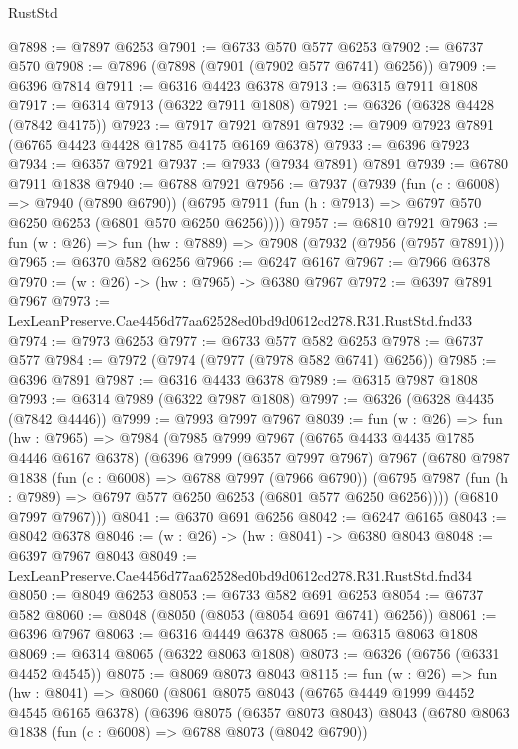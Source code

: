 \begin{lexlean}{RustStd}
\begin{coremodule}
@7898 := @7897 @6253
@7901 := @6733 @570 @577 @6253
@7902 := @6737 @570
@7908 := @7896 (@7898 (@7901 (@7902 @577 @6741) @6256))
@7909 := @6396 @7814
@7911 := @6316 @4423 @6378
@7913 := @6315 @7911 @1808
@7917 := @6314 @7913 (@6322 @7911 @1808)
@7921 := @6326 (@6328 @4428 (@7842 @4175))
@7923 := @7917 @7921 @7891
@7932 := @7909 @7923 @7891 (@6765 @4423 @4428 @1785 @4175 @6169 @6378)
@7933 := @6396 @7923
@7934 := @6357 @7921
@7937 := @7933 (@7934 @7891) @7891
@7939 := @6780 @7911 @1838
@7940 := @6788 @7921
@7956 := @7937
    (@7939
      (fun (c : @6008) => @7940 (@7890 @6790))
      (@6795 @7911 (fun (h : @7913) => @6797 @570 @6250 @6253 (@6801 @570 @6250 @6256))))
@7957 := @6810 @7921
@7963 := fun (w : @26) => fun (hw : @7889) => @7908 (@7932 (@7956 (@7957 @7891)))
@7965 := @6370 @582 @6256
@7966 := @6247 @6167
@7967 := @7966 @6378
@7970 := (w : @26) -> (hw : @7965) -> @6380 @7967
@7972 := @6397 @7891 @7967
@7973 := LexLeanPreserve.Cae4456d77aa62528ed0bd9d0612cd278.R31.RustStd.fnd33
@7974 := @7973 @6253
@7977 := @6733 @577 @582 @6253
@7978 := @6737 @577
@7984 := @7972 (@7974 (@7977 (@7978 @582 @6741) @6256))
@7985 := @6396 @7891
@7987 := @6316 @4433 @6378
@7989 := @6315 @7987 @1808
@7993 := @6314 @7989 (@6322 @7987 @1808)
@7997 := @6326 (@6328 @4435 (@7842 @4446))
@7999 := @7993 @7997 @7967
@8039 := fun (w : @26) =>
  fun (hw : @7965) =>
  @7984
    (@7985
      @7999
      @7967
      (@6765 @4433 @4435 @1785 @4446 @6167 @6378)
      (@6396
        @7999
        (@6357 @7997 @7967)
        @7967
        (@6780
          @7987
          @1838
          (fun (c : @6008) => @6788 @7997 (@7966 @6790))
          (@6795 @7987 (fun (h : @7989) => @6797 @577 @6250 @6253 (@6801 @577 @6250 @6256))))
        (@6810 @7997 @7967)))
@8041 := @6370 @691 @6256
@8042 := @6247 @6165
@8043 := @8042 @6378
@8046 := (w : @26) -> (hw : @8041) -> @6380 @8043
@8048 := @6397 @7967 @8043
@8049 := LexLeanPreserve.Cae4456d77aa62528ed0bd9d0612cd278.R31.RustStd.fnd34
@8050 := @8049 @6253
@8053 := @6733 @582 @691 @6253
@8054 := @6737 @582
@8060 := @8048 (@8050 (@8053 (@8054 @691 @6741) @6256))
@8061 := @6396 @7967
@8063 := @6316 @4449 @6378
@8065 := @6315 @8063 @1808
@8069 := @6314 @8065 (@6322 @8063 @1808)
@8073 := @6326 (@6756 (@6331 @4452 @4545))
@8075 := @8069 @8073 @8043
@8115 := fun (w : @26) =>
  fun (hw : @8041) =>
  @8060
    (@8061
      @8075
      @8043
      (@6765 @4449 @1999 @4452 @4545 @6165 @6378)
      (@6396
        @8075
        (@6357 @8073 @8043)
        @8043
        (@6780
          @8063
          @1838
          (fun (c : @6008) => @6788 @8073 (@8042 @6790))

\end{coremodule}
\end{lexlean}
